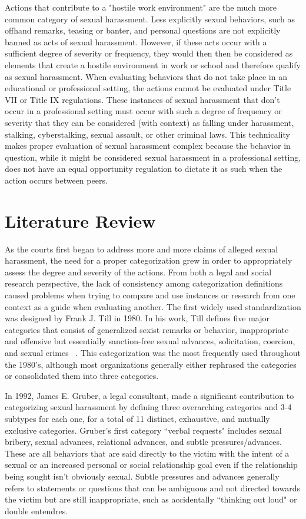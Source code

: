 Actions that contribute to a "hostile work environment" are the much more common category of sexual harassment. Less explicitly sexual behaviors, such as offhand remarks, teasing or banter, and personal questions are not explicitly banned as acts of sexual harassment. However, if these acts occur with a sufficient degree of severity or frequency, they would then then be considered as elements that create a hostile environment in work or school and therefore qualify as sexual harassment. When evaluating behaviors that do not take place in an educational or professional setting, the actions cannot be evaluated under Title VII or Title IX regulations. These instances of sexual harassment that don't occur in a professional setting must occur with such a degree of frequency or severity that they can be considered (with context) as falling under harassment, stalking, cyberstalking, sexual assault, or other criminal laws. This technicality makes proper evaluation of sexual harassment complex because the behavior in question, while it might be considered sexual harassment in a professional setting, does not have an equal opportunity regulation to dictate it as such when the action occurs between peers.

\section{Literature Review}

As the courts first began to address more and more claims of alleged sexual harassment, the need for a proper categorization grew in order to appropriately assess the degree and severity of the actions. From both a legal and social research perspective, the lack of consistency among categorization definitions caused problems when trying to compare and use instances or research from one context as a guide when evaluating another. The first widely used standardization was designed by Frank J. Till in 1980. In his work, Till defines five major categories that consist of generalized sexist remarks or behavior, inappropriate and offensive but essentially sanction-free sexual advances, solicitation, coercion, and sexual crimes ~\cite{till}. This categorization was the most frequently used throughout the 1980's, although most organizations generally either rephrased the categories or consolidated them into three categories.

In 1992, James E. Gruber, a legal consultant, made a significant contribution to categorizing sexual harassment by defining three overarching categories and 3-4 subtypes for each one, for a total of 11 distinct, exhaustive, and mutually exclusive categories. Gruber's first category ``verbal requests" includes sexual bribery, sexual advances, relational advances, and subtle pressures/advances. These are all behaviors that are said directly to the victim with the intent of a sexual or an increased personal or social relationship goal even if the relationship being sought isn't obviously sexual. Subtle pressures and advances generally refers to statements or questions that can be ambiguous and not directed towards the victim but are still inappropriate, such as accidentally ``thinking out loud" or double entendres.

